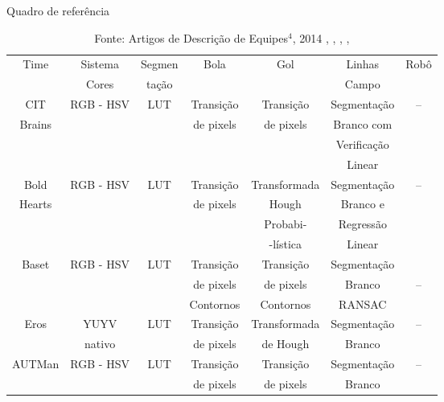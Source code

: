 \begin{table}[ht!]
    \caption{Quadro de referência} \label{tbl:Times}
    \centering
    \begin{tabular}{|c|c|c|c|c|c|c|}
    \hline 
    Time 	& Sistema 	& Segmen  	& Bola		& Gol 		   & Linhas	   & Robô	\\ 
    	 	& Cores   	& tação		& 		&     		   & Campo	   & 	 	\\ 
    \hline 

    CIT 	& RGB - HSV 	& LUT	  	& Transição	&  Transição	   & Segmentação   & --	     	\\
    Brains	& 	 	& 	  	& de pixels	&  de pixels	   & Branco com    &	     	\\
    		& 	 	& 	  	& 		&  	 	   & Verificação   &	     	\\
    		& 	 	& 	  	& 		&  	 	   & Linear        &	     	\\

    \hline 

    Bold 	& RGB - HSV 	& LUT	  	& Transição	&  Transformada	   & Segmentação   & --     	\\
    Hearts	& 	 	& 	  	& de pixels	&  Hough 	   & Branco e      &	     	\\
    		& 	 	& 	  	& 		&  Probabi-  	   & Regressão     &	     	\\
    		& 	 	& 	  	& 		&  -lística	   & Linear        &	     	\\
    \hline 

    Baset	& RGB - HSV 	& LUT	  	& Transição	&  Transição	   & Segmentação   &            \\
    		& 	 	& 	  	& de pixels	&  de pixels	   & Branco        & --     	\\
    		& 	 	& 	  	& Contornos	&  Contornos       & RANSAC        &	     	\\
    \hline 

    Eros	& YUYV  	& LUT	  	& Transição	&  Transformada	   & Segmentação   & --	     	\\
    		& nativo	& 	  	& de pixels	&  de Hough	   & Branco        &	     	\\

    \hline 
     
    AUTMan	& RGB - HSV 	& LUT	  	& Transição	&  Transição	   & Segmentação   & --	     \\
    		& 	 	& 	  	& de pixels	&  de pixels       & Branco        &	     \\
    \hline

    \end{tabular}
    \caption*{Fonte: Artigos de Descrição de Equipes$^4$, 2014 \cite{AUTMan}, \cite{Bold}, \cite{CIT}, \cite{Baset}, \cite{EROS} }

\end{table}

